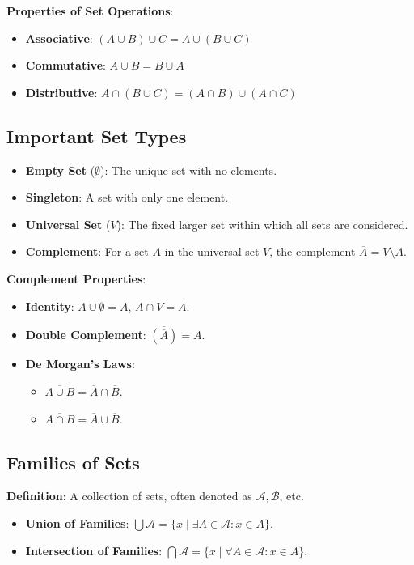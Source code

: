 \textbf{Properties of Set Operations}:
\begin{itemize}
    \item \textbf{Associative}: $(A \cup B) \cup C = A \cup (B \cup C)$
    \item \textbf{Commutative}: $A \cup B = B \cup A$
    \item \textbf{Distributive}: $A \cap (B \cup C) = (A \cap B) \cup (A \cap C)$
\end{itemize}

\subsection{Important Set Types}

\begin{itemize}
    \item \textbf{Empty Set} ($\emptyset$): The unique set with no elements.
    \item \textbf{Singleton}: A set with only one element.
    \item \textbf{Universal Set} ($V$): The fixed larger set within which all sets are considered.
    \item \textbf{Complement}: For a set $A$ in the universal set $V$, the complement $\overline{A} = V \setminus A$.
\end{itemize}

\textbf{Complement Properties}:
\begin{itemize}
    \item \textbf{Identity}: $A \cup \emptyset = A$, $A \cap V = A$.
    \item \textbf{Double Complement}: $\overline{(\overline{A})} = A$.
    \item \textbf{De Morgan’s Laws}:
    \begin{itemize}
        \item $\overline{A \cup B} = \overline{A} \cap \overline{B}$.
        \item $\overline{A \cap B} = \overline{A} \cup \overline{B}$.
    \end{itemize}
\end{itemize}

\subsection{Families of Sets}

\textbf{Definition}: A collection of sets, often denoted as $\mathcal{A}, \mathcal{B}$, etc.
\begin{itemize}
    \item \textbf{Union of Families}: $\bigcup \mathcal{A} = \{ x \mid \exists A \in \mathcal{A} : x \in A \}$.
    \item \textbf{Intersection of Families}: $\bigcap \mathcal{A} = \{ x \mid \forall A \in \mathcal{A} : x \in A \}$.
\end{itemize}

